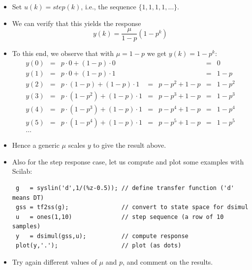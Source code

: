 \begin{frame}
\myPause
 \begin{itemize}[<+-| alert@+>]
 \item Set $u(k)=step(k)$, i.e., the sequence $\{1,1,1,1,\ldots\}$.
 \item We can verify that this yields the response
       \begin{displaymath}
        y(k) = \frac{\mu}{1-p}(1-p^k)
       \end{displaymath}
 \item To this end, we observe that with $\mu=1-p$ we get $y(k) = 1-p^k$:
       {\scriptsize
       \begin{displaymath}
        \begin{array}{lclclclclcl}
         y(0) &=& p \cdot 0       + (1-p) \cdot 0 & &           &=& 0     \\
         y(1) &=& p \cdot 0       + (1-p) \cdot 1 & &           &=& 1-p   \\
         y(2) &=& p \cdot (1-p)   + (1-p) \cdot 1 &=& p-p^2+1-p &=& 1-p^2 \\
         y(3) &=& p \cdot (1-p^2) + (1-p) \cdot 1 &=& p-p^3+1-p &=& 1-p^3 \\
         y(4) &=& p \cdot (1-p^3) + (1-p) \cdot 1 &=& p-p^4+1-p &=& 1-p^4 \\
         y(5) &=& p \cdot (1-p^4) + (1-p) \cdot 1 &=& p-p^5+1-p &=& 1-p^5 \\
         \ldots
        \end{array}
       \end{displaymath}
       }
 \item \vspace{-4mm}Hence a generic $\mu$ scales $y$ to give the result above.
 \end{itemize}
\end{frame}

\begin{frame}[fragile]
\myPause
 \begin{itemize}[<+-| alert@+>]

 \item Also for the step response case, let us compute and plot some examples with Scilab:
       {\small
       \begin{verbatim}
 g   = syslin('d',1/(%z-0.5)); // define transfer function ('d' means DT)
 gss = tf2ss(g);               // convert to state space for dsimul
 u   = ones(1,10)              // step sequence (a row of 10 samples)
 y   = dsimul(gss,u);          // compute response
 plot(y,'.');                  // plot (as dots)
       \end{verbatim}
       }
 \item Try again different values of $\mu$ and $p$, and comment on the results.
 \end{itemize}
\end{frame}

